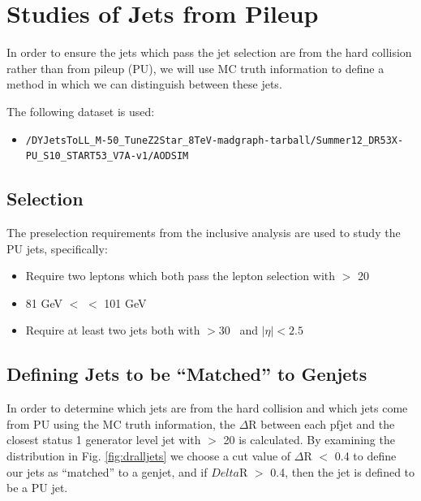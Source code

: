 \clearpage


\section{Studies of Jets from Pileup}
\label{sec:pujets}

In order to ensure the jets which pass the jet selection are from the hard collision rather than from pileup (PU), we will use MC truth information to define a method in which we can distinguish between these jets.

The following dataset is used:

\begin{itemize}
\scriptsize
\item \verb=/DYJetsToLL_M-50_TuneZ2Star_8TeV-madgraph-tarball/Summer12_DR53X-PU_S10_START53_V7A-v1/AODSIM=
\end{itemize}

\subsection{Selection}
The preselection requirements from the inclusive analysis are used to study the PU jets, specifically:

\begin{itemize}
\item Require two leptons which both pass the lepton selection with \pt $>$ 20 \GeVc 
\item 81 GeV $<$ \mll $<$ 101 GeV
\item Require at least two jets both with \pt $> 30$ \GeVc~and $|\eta| < 2.5$ 
\end{itemize}

\subsection{Defining Jets to be ``Matched'' to Genjets}
In order to determine which jets are from the hard collision and which jets come from PU using the MC truth information, the $\Delta$R between each pfjet and the closest status 1 generator level jet with \pt $>$ 20 \GeVc is calculated. By examining the distribution in Fig. \ref{fig:dralljets} we choose a cut value of $\Delta$R $<$ 0.4 to define our jets as ``matched'' to a genjet, and if $Delta$R $>$ 0.4, then the jet is defined to be a PU jet.

